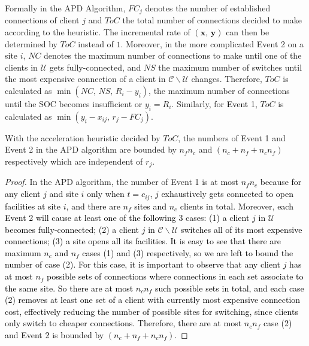 \documentclass[10pt]{llncs}
\begin{document}
Formally in the APD Algorithm, $FC_{j}$ denotes the number of established
connections of client $j$ and $ToC$ the total number of connections
decided to make according to the heuristic. The incremental rate of
\textcolor{black}{$\left(\boldsymbol{x},\,\boldsymbol{y}\right)$}
can then be determined by $ToC$ instead of $1$. Moreover, in the
more complicated Event 2 on a site $i$, $NC$ denotes the maximum
number of connections to make until one of the clients in $\mathcal{U}$
gets fully-connected, and $NS$ the maximum number of switches until
the most expensive connection of a client in $\mathcal{C}\backslash\mathcal{U}$
changes. Therefore, $ToC$ is calculated as $\min\left(NC,\, NS,\, R_{i}-y_{i}\right)$,
the maximum number of connections until the SOC becomes insufficient
or $y_{i}=R_{i}$. Similarly, for \textcolor{black}{Event }1, $ToC$
is calculated as $\min\left(y_{i}-x_{ij},\, r_{j}-FC_{j}\right)$.
\begin{lemma}
With the acceleration heuristic decided by \textup{$ToC$}, the numbers
of Event 1 and Event 2 in the APD algorithm are bounded by \textcolor{black}{$n_{f}n_{c}$}
and \textcolor{black}{$\left(n_{c}+n_{f}+n_{c}n_{f}\right)$} respectively
which are independent of $r_{j}$.\label{lem:suh}\end{lemma}
\begin{proof}
In the APD algorithm, the number of Event 1 is \textcolor{black}{at
most $n_{f}n_{c}$ because for any client $j$ and site $i$ only
when $t=c_{ij}$, $j$ exhaustively gets connected to open facilities
at site $i$, and there are $n_{f}$ sites and $n_{c}$ clients in
total. }Moreover, \textcolor{black}{each Event 2 will cause at least
one of the following 3 cases: (1) a client $j$ in }$\mathcal{\mathcal{U}}$\textcolor{black}{{}
becomes fully-connected; (2) a client $j$ in }$\mathcal{\mathcal{\mathcal{C}\backslash\mathcal{U}}}$\textcolor{black}{{}
switches all of its most expensive connections; (3) a site opens all
its facilities. It is easy to see that there are maximum $n_{c}$
and $n_{f}$ cases (1) and (3) respectively, so we are left to bound
the number of case (2). For this case, it is important to observe
that any client $j$ has at most $n_{f}$ possible sets of connections
where connections in each set associate to the same site. So there
are at most $n_{c}n_{f}$ such possible sets in total, and each case
(2) removes at least one set of a client with currently most expensive
connection cost, effectively reducing the number of possible sites
for switching, since clients only switch to cheaper connections. Therefore,
there are at most $n_{c}n_{f}$ case (2) and Event 2 is bounded by
$\left(n_{c}+n_{f}+n_{c}n_{f}\right)$.}\end{proof}
\end{document}

